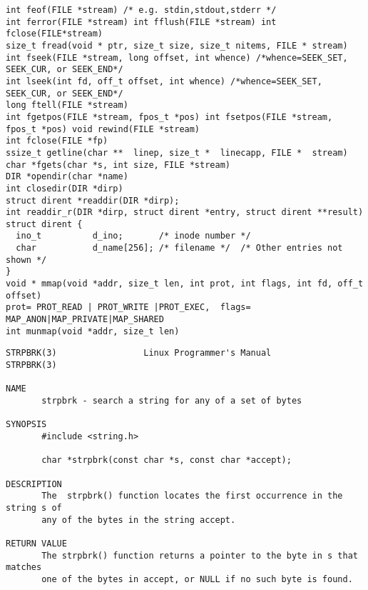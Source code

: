 \begin{verbatim}
int feof(FILE *stream) /* e.g. stdin,stdout,stderr */
int ferror(FILE *stream) int fflush(FILE *stream) int fclose(FILE*stream)
size_t fread(void * ptr, size_t size, size_t nitems, FILE * stream)
int fseek(FILE *stream, long offset, int whence) /*whence=SEEK_SET, SEEK_CUR, or SEEK_END*/
int lseek(int fd, off_t offset, int whence) /*whence=SEEK_SET, SEEK_CUR, or SEEK_END*/
long ftell(FILE *stream)
int fgetpos(FILE *stream, fpos_t *pos) int fsetpos(FILE *stream, fpos_t *pos) void rewind(FILE *stream)
int fclose(FILE *fp)
ssize_t getline(char **  linep, size_t *  linecapp, FILE *  stream)
char *fgets(char *s, int size, FILE *stream)
DIR *opendir(char *name)
int closedir(DIR *dirp)
struct dirent *readdir(DIR *dirp);
int readdir_r(DIR *dirp, struct dirent *entry, struct dirent **result)
struct dirent {
  ino_t          d_ino;       /* inode number */
  char           d_name[256]; /* filename */  /* Other entries not shown */
}
void * mmap(void *addr, size_t len, int prot, int flags, int fd, off_t offset)
prot= PROT_READ | PROT_WRITE |PROT_EXEC,  flags= MAP_ANON|MAP_PRIVATE|MAP_SHARED 
int munmap(void *addr, size_t len)
\end{verbatim}\clearpage
\begin{verbatim}
STRPBRK(3)                 Linux Programmer's Manual                STRPBRK(3)

NAME
       strpbrk - search a string for any of a set of bytes

SYNOPSIS
       #include <string.h>

       char *strpbrk(const char *s, const char *accept);

DESCRIPTION
       The  strpbrk() function locates the first occurrence in the string s of
       any of the bytes in the string accept.

RETURN VALUE
       The strpbrk() function returns a pointer to the byte in s that  matches
       one of the bytes in accept, or NULL if no such byte is found.


\end{verbatim}




 
